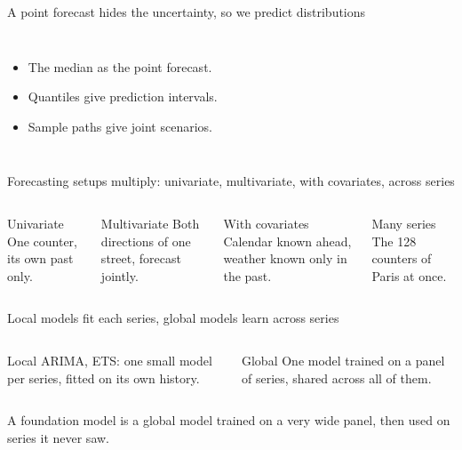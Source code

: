 \begin{frame}{A point forecast hides the uncertainty, so we predict distributions}
  \begin{columns}[c]
    \begin{itemize}
      \item The median as the point forecast.
      \item Quantiles give prediction intervals.
      \item Sample paths give joint scenarios.
    \end{itemize}
  \end{columns}
\end{frame}

\begin{frame}{Forecasting setups multiply: univariate, multivariate, with covariates, across series}
  \begin{columns}[T]
    \begin{block}{Univariate}
      One counter, its own past only. 
    \end{block}
    \begin{block}{Multivariate}
      Both directions of one street, forecast jointly. 
    \end{block}
    \begin{alertblock}{With covariates}
      Calendar known ahead, weather known only in the past. 
    \end{alertblock}
    \begin{alertblock}{Many series}
      The 128 counters of Paris at once. 
    \end{alertblock}
  \end{columns}
\end{frame}

\begin{frame}{Local models fit each series, global models learn across series}
  \begin{columns}[T]
    \begin{exampleblock}{Local}
      ARIMA, ETS: one small model per series, fitted on its own history.
    \end{exampleblock}
    \begin{block}{Global}
      One model trained on a panel of series, shared across all of them.
    \end{block}
  \end{columns}
  \vskip2mm
  A foundation model is a global model trained on a very wide panel, then used on
  series it never saw.
\end{frame}

